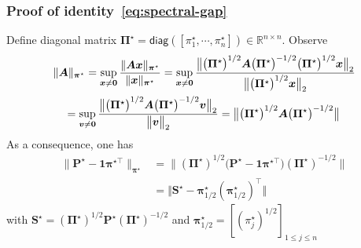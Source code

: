 \documentclass[compress,
mathserif,wide,%
]{beamer}
\begin{document}
\begin{frame}
	\frametitle{Proof of identity~\eqref{eq:spectral-gap}}
	Define diagonal matrix $\bm{\Pi}^{\star} = \mathsf{diag}([\pi_{1}^{\star}, \cdots, \pi_{n}^{\star}])\in\mathbb{R}^{n\times n}$. Observe
	\begin{align*}
	& \|\bm{A}\|_{\bm{\pi}^{\star}}  =\sup_{\bm{x}\neq\bm{0}}\frac{\|\bm{A}\bm{x}\|_{\bm{\pi}^{\star}}}{\|\bm{x}\|_{\bm{\pi}^{\star}}}=\sup_{\bm{x}\neq\bm{0}}\frac{\big\|\big(\bm{\Pi}^{\star}\big)^{1/2}\bm{A}\big(\bm{\Pi}^{\star}\big)^{-1/2}\big(\bm{\Pi}^{\star}\big)^{1/2}\bm{x}\big\|_{2}}{\big\|\big(\bm{\Pi}^{\star}\big)^{1/2}\bm{x}\big\|_{2}} \notag\\
	& \quad =\sup_{\bm{v}\neq\bm{0}}\frac{\big\|\big(\bm{\Pi}^{\star}\big)^{1/2}\bm{A}\big(\bm{\Pi}^{\star}\big)^{-1/2}\bm{v}\big\|_{2}}{\big\|\bm{v}\big\|_{2}}=\big\|\big(\bm{\Pi}^{\star}\big)^{1/2}\bm{A}\big(\bm{\Pi}^{\star}\big)^{-1/2}\big\|
\end{align*}
As a consequence, one has
\begin{align*}
\|\bm{P}^{\star}-\bm{1}\bm{\pi}^{\star\top}\|_{\bm{\pi}^{\star}} & =\|\left(\bm{\Pi}^{\star}\right)^{1/2}\big(\bm{P}^{\star}-\bm{1}\bm{\pi}^{\star\top}\big)\left(\bm{\Pi}^{\star}\right)^{-1/2}\|\\
	& =\big\Vert \bm{S}^{\star}- \bm{\pi}^{\star}_{1/2}(\bm{\pi}^{\star}_{1/2})^{\top} \big\Vert
\end{align*}
with $\bm{S}^{\star} = \left(\bm{\Pi}^{\star}\right)^{1/2} \bm{P}^{\star} \left(\bm{\Pi}^{\star}\right)^{-1/2}$ and $\bm{\pi}_{1/2}^{\star} = [(\pi^\star_{j})^{1/2}]_{1\leq j \leq n}$
\end{frame}
\end{document}
